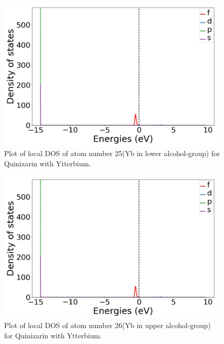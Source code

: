 \documentclass{article}
\begin{document}
  \begin{figure}[H]
      \centering
      \includegraphics[width = 11cm]{../fig/Yb_LDOS25_1.png}
      \caption{Plot of local DOS of atom number 25(Yb in lower alcohol-group) for Quinizarin with Ytterbium. }
      \label{fig:Yb_LDOS25_1}
  \end{figure}

  \begin{figure}[H]
      \centering
      \includegraphics[width = 11cm]{../fig/Yb_LDOS26_1.png}
      \caption{Plot of local DOS of atom number 26(Yb in upper alcohol-group) for Quinizarin with Ytterbium. }
      \label{fig:Yb_LDOS26_1}
  \end{figure}


\end{document}

